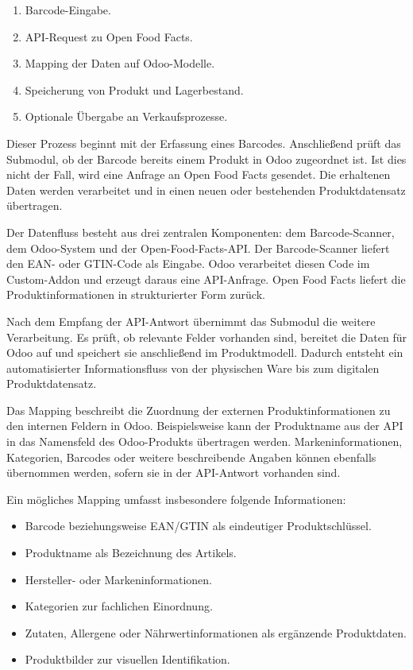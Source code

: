 \documentclass[12pt,a4paper]{article}
\begin{document}
\begin{enumerate}
    \item Barcode-Eingabe.
    \item API-Request zu Open Food Facts.
    \item Mapping der Daten auf Odoo-Modelle.
    \item Speicherung von Produkt und Lagerbestand.
    \item Optionale Übergabe an Verkaufsprozesse.
\end{enumerate}

Dieser Prozess beginnt mit der Erfassung eines Barcodes. Anschließend prüft das Submodul, ob der Barcode bereits einem Produkt in Odoo zugeordnet ist. Ist dies nicht der Fall, wird eine Anfrage an Open Food Facts gesendet. Die erhaltenen Daten werden verarbeitet und in einen neuen oder bestehenden Produktdatensatz übertragen.

Der Datenfluss besteht aus drei zentralen Komponenten: dem Barcode-Scanner, dem Odoo-System und der Open-Food-Facts-API. Der Barcode-Scanner liefert den EAN- oder GTIN-Code als Eingabe. Odoo verarbeitet diesen Code im Custom-Addon und erzeugt daraus eine API-Anfrage. Open Food Facts liefert die Produktinformationen in strukturierter Form zurück.

Nach dem Empfang der API-Antwort übernimmt das Submodul die weitere Verarbeitung. Es prüft, ob relevante Felder vorhanden sind, bereitet die Daten für Odoo auf und speichert sie anschließend im Produktmodell. Dadurch entsteht ein automatisierter Informationsfluss von der physischen Ware bis zum digitalen Produktdatensatz.

Das Mapping beschreibt die Zuordnung der externen Produktinformationen zu den internen Feldern in Odoo. Beispielsweise kann der Produktname aus der API in das Namensfeld des Odoo-Produkts übertragen werden. Markeninformationen, Kategorien, Barcodes oder weitere beschreibende Angaben können ebenfalls übernommen werden, sofern sie in der API-Antwort vorhanden sind.

Ein mögliches Mapping umfasst insbesondere folgende Informationen:

\begin{itemize}
    \item Barcode beziehungsweise EAN/GTIN als eindeutiger Produktschlüssel.
    \item Produktname als Bezeichnung des Artikels.
    \item Hersteller- oder Markeninformationen.
    \item Kategorien zur fachlichen Einordnung.
    \item Zutaten, Allergene oder Nährwertinformationen als ergänzende Produktdaten.
    \item Produktbilder zur visuellen Identifikation.
\end{itemize}
\end{document}

